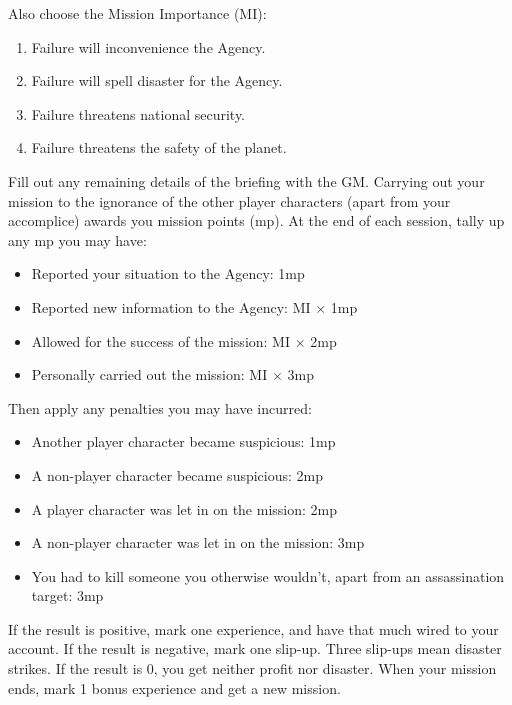 Also choose the Mission Importance (MI):
\begin{enumerate}
\item Failure will inconvenience the Agency.
\item Failure will spell disaster for the Agency.
\item Failure threatens national security.
\item Failure threatens the safety of the planet.
\end{enumerate}

Fill out any remaining details of the briefing with the GM. Carrying
out your mission to the ignorance of the other player characters
(apart from your accomplice) awards you mission points (mp). At the
end of each session, tally up any mp you may have:

\begin{itemize}
\item Reported your situation to the Agency: 1mp
\item Reported new information to the Agency: MI $\times$ 1mp
\item Allowed for the success of the mission: MI $\times$ 2mp
\item Personally carried out the mission: MI $\times$ 3mp
\end{itemize}

Then apply any penalties you may have incurred:
\begin{itemize}
\item Another player character became suspicious: 1mp
\item A non-player character became suspicious: 2mp
\item A player character was let in on the mission: 2mp
\item A non-player character was let in on the mission: 3mp
\item You had to kill someone you otherwise wouldn't, apart from an assassination target: 3mp
\end{itemize}

If the result is positive, mark one experience, and have that much \money wired to your account. If the result is negative, mark one slip-up. Three slip-ups mean disaster strikes. If the result is 0, you get neither profit nor disaster. When your mission ends, mark 1 bonus experience and get a new mission.


